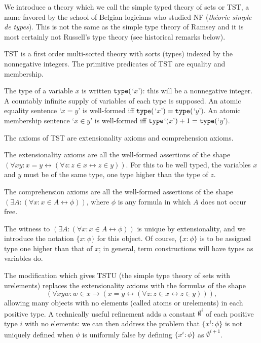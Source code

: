 \documentclass[12pt]{article}
\begin{document}
We introduce a theory which we call the simple typed theory of sets or TST, a name favored by the school of Belgian logicians who studied NF ({\em th\'eorie simple de types}).  This is not the same as the simple type theory of Ramsey and it is most certainly not Russell's type theory  (see historical remarks below).

TST is a first order multi-sorted theory with sorts (types) indexed by the nonnegative integers.  The primitive predicates of TST are equality and membership.

The type of a variable $x$ is written ${\tt type}($`$x$'$)$:  this will be a nonnegative integer.   A countably infinite supply of variables of each type is supposed.  An atomic equality sentence `$x=y$' is well-formed iff ${\tt type}($`$x$'$)={\tt type}($`$y$'$)$.
An atomic membership sentence `$x \in y$' is well-formed iff ${\tt type}$`$(x$'$)+1 = {\tt type}($`$y$'$)$.

The axioms of TST are extensionality axioms and comprehension axioms.

The extensionality axioms are all the well-formed assertions of the shape $(\forall xy:x=y \leftrightarrow (\forall z:z \in x \leftrightarrow z\in y))$.  For this to be well typed, the variables
$x$ and $y$ must be of the same type, one type higher than the type of $z$.

The comprehension axioms are all the well-formed assertions of the shape $(\exists A:(\forall x:x \in A \leftrightarrow \phi))$, where $\phi$ is any formula in which $A$ does not occur free.

The witness to $(\exists A:(\forall x:x \in A \leftrightarrow \phi))$ is unique by extensionality, and we introduce the notation $\{x:\phi\}$ for this object.  Of course, $\{x:\phi\}$  is to be assigned type one higher than that of $x$;  in general, term constructions will have types as variables do.

The modification which gives TSTU (the simple type theory of sets with urelements) replaces the extensionality axioms with the formulas of the shape $$(\forall xyw:w \in x \rightarrow (x=y \leftrightarrow (\forall z:z \in x \leftrightarrow z\in y))),$$  allowing many objects with no elements (called atoms or urelements)  in each positive type.  A technically useful refinement adds a constant $\emptyset^i$ of each positive type $i$ with no elements:  we can then address the problem that $\{x^i:\phi\}$ is not uniquely defined when $\phi$ is uniformly false by defining $\{x^i:\phi\}$ as $\emptyset^{i+1}$.
\end{document}
